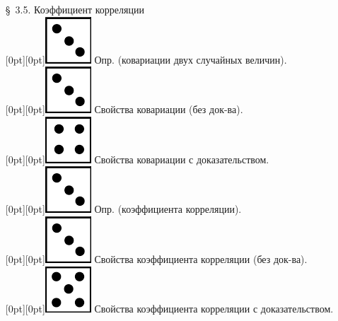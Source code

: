 \documentclass[10pt]{amsart}
\begin{document}
\begin{enumerate}
\begin{enumerate}
\item[\S\, 3.5.] Коэффициент корреляции \\
 \raisebox{-1pt}[0pt][0pt]{\includegraphics[width=0.02\linewidth]{3.png}} Опр. (ковариации двух случайных величин). \\
 \raisebox{-1pt}[0pt][0pt]{\includegraphics[width=0.02\linewidth]{3.png}} Свойства ковариации (без док-ва). \\
 \raisebox{-1pt}[0pt][0pt]{\includegraphics[width=0.02\linewidth]{4.png}} Свойства ковариации с доказательством. \\
 \raisebox{-1pt}[0pt][0pt]{\includegraphics[width=0.02\linewidth]{3.png}} Опр. (коэффициента корреляции). \\
 \raisebox{-1pt}[0pt][0pt]{\includegraphics[width=0.02\linewidth]{3.png}} Свойства коэффициента корреляции (без док-ва). \\
 \raisebox{-1pt}[0pt][0pt]{\includegraphics[width=0.02\linewidth]{5.png}} Свойства коэффициента корреляции с доказательством. \\



       
        


\end{enumerate}
\end{enumerate}
\end{document}
